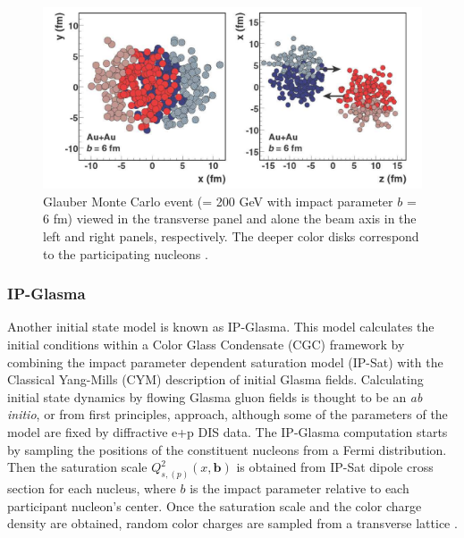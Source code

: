 \begin{figure}[h!]
\begin{center}
\includegraphics[width=0.65\linewidth]{figs/glauber_auau_example.png}
\caption{Glauber Monte Carlo event (\auau \sqsn = 200 GeV with impact parameter $b$ = 6 fm) viewed in the transverse panel and alone the beam axis in the left and right panels, respectively. The deeper color disks correspond to the participating nucleons \cite{annurev.nucl.57.090506.123020}.}
\label{fig:glauberauauexample}
\end{center}
\end{figure}



\subsubsection{IP-Glasma}%
Another initial state model is known as IP-Glasma. This model calculates the initial conditions within a Color Glass Condensate (CGC) framework by combining the impact parameter dependent saturation model (IP-Sat) with the Classical Yang-Mills (CYM) description of initial Glasma fields. Calculating initial state dynamics by flowing Glasma gluon fields is thought to be an \textit{ab initio}, or from first principles, approach, although some of the parameters of the model are fixed by diffractive e+p DIS data. The IP-Glasma computation starts by sampling the positions of the constituent nucleons from a Fermi distribution. Then the saturation scale $Q^2_{s,(p)}(x,\textbf{b})$ is obtained from IP-Sat dipole cross section for each nucleus, where $b$ is the impact parameter relative to each participant nucleon's center. Once the saturation scale and the color charge density are obtained, random color charges are sampled from a transverse lattice \cite{PhysRevLett.108.252301}.

